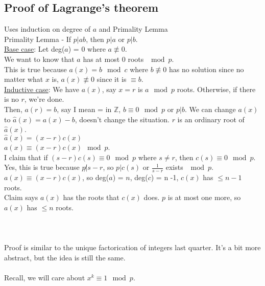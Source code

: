   \subsection*{Proof of Lagrange's theorem}
    Uses induction on degree of $a$ and Primality Lemma\\
    Primality Lemma - If $p | ab$, then $p | a$ or $p | b$.\\
    \underline{Base case}: Let deg($a$) = 0 where $a \not\equiv 0$.\\
    We want to know that $a$ has at most 0 roots $\mod p$.\\
    This is true because $a(x) = b \mod c$ where $b \not\equiv 0$ has no
    solution since no matter what $x$ is, $a(x) \not\equiv 0$ since it is
    $\equiv b$. \\
    \underline{Inductive case}: We have $a(x)$, say $x = r$ is $a \mod p$ roots.
    Otherwise, if there is no $r$, we're done.\\
    Then, $a(r) = b$, say I mean = in $\mathbb{Z}$, $b \equiv 0 \mod p$ or 
    $p | b$. We can change $a(x)$ to $\hat{a}(x) = a(x) - b$, doesn't change the 
    situation. $r$ is an ordinary root of $\hat{a}(x)$.\\
    $\hat{a}(x) = (x-r)c(x)$\\
    $a(x) \equiv (x-r)c(x) \mod p$.\\
    I claim that if $(s-r)c(s) \equiv 0 \mod p$ where $s \not= r$, then 
    $c(s) \equiv 0 \mod p$.\\
    Yes, this is true because $p \not| s - r$, so $p | c(s)$ or $\frac{1}{s-r}$
    exists $\mod p$.\\
    $a(x) \equiv (x-r)c(x)$, so deg($a$) = $n$, deg($c$) = n -1, $c(x)$ has
    $\le n-1$ roots.\\
    Claim says $a(x)$ has the roots that $c(x)$ does. $p$ is at most
    one more, so $a(x)$ has $\le n$ roots.\\\\
   \\\\
  Proof is similar to the unique factorication of integers last quarter. It's
  a bit more abstract, but the idea is still the same.\\\\
  Recall, we will care about $x^k \equiv 1 \mod p$.\\
